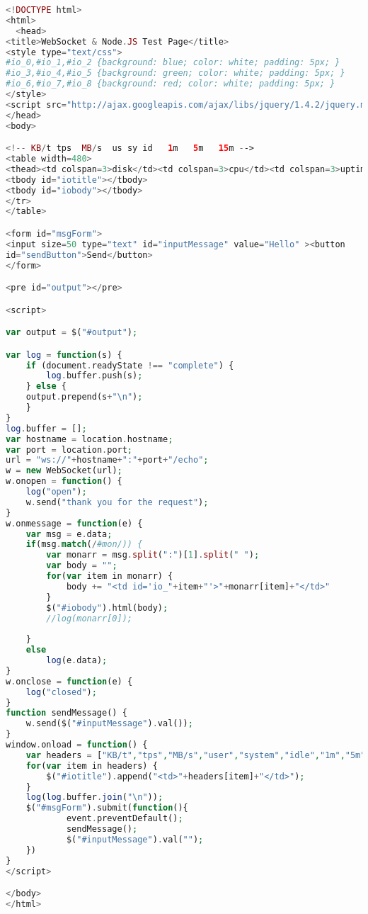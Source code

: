 \begin{compactitem}
\begin{lstlisting}[language=PHP,basicstyle=\ttfamily\footnotesize]
<!DOCTYPE html>
<html>
  <head>
<title>WebSocket & Node.JS Test Page</title>
<style type="text/css">
#io_0,#io_1,#io_2 {background: blue; color: white; padding: 5px; }
#io_3,#io_4,#io_5 {background: green; color: white; padding: 5px; }
#io_6,#io_7,#io_8 {background: red; color: white; padding: 5px; }
</style>
<script src="http://ajax.googleapis.com/ajax/libs/jquery/1.4.2/jquery.min.js" type="text/javascript" charset="utf-8"></script>
</head>
<body>

<!-- KB/t tps  MB/s  us sy id   1m   5m   15m -->
<table width=480>
<thead><td colspan=3>disk</td><td colspan=3>cpu</td><td colspan=3>uptime</td></thead>
<tbody id="iotitle"></tbody>
<tbody id="iobody"></tbody>
</tr>
</table>

<form id="msgForm">
<input size=50 type="text" id="inputMessage" value="Hello" ><button
id="sendButton">Send</button>
</form>

<pre id="output"></pre>

<script>

var output = $("#output");

var log = function(s) {
    if (document.readyState !== "complete") {
        log.buffer.push(s);
    } else {
	output.prepend(s+"\n");
    }
}
log.buffer = [];
var hostname = location.hostname;
var port = location.port;
url = "ws://"+hostname+":"+port+"/echo";
w = new WebSocket(url);
w.onopen = function() {
    log("open");
    w.send("thank you for the request");
}
w.onmessage = function(e) {
	var msg = e.data;
	if(msg.match(/#mon/)) {
		var monarr = msg.split(":")[1].split(" ");
		var body = "";
		for(var item in monarr) {
			body += "<td id='io_"+item+"'>"+monarr[item]+"</td>"
		}
		$("#iobody").html(body);
		//log(monarr[0]);
		
	}
	else
    	log(e.data);
}
w.onclose = function(e) {
    log("closed");
}
function sendMessage() {
	w.send($("#inputMessage").val());
}
window.onload = function() {
	var headers = ["KB/t","tps","MB/s","user","system","idle","1m","5m","15m"];
	for(var item in headers) {
		$("#iotitle").append("<td>"+headers[item]+"</td>");
	}
    log(log.buffer.join("\n"));
    $("#msgForm").submit(function(){
    		event.preventDefault();
    		sendMessage();
    		$("#inputMessage").val("");
	})
}
</script>

</body>
</html>
\end{lstlisting}


\end{compactitem}

